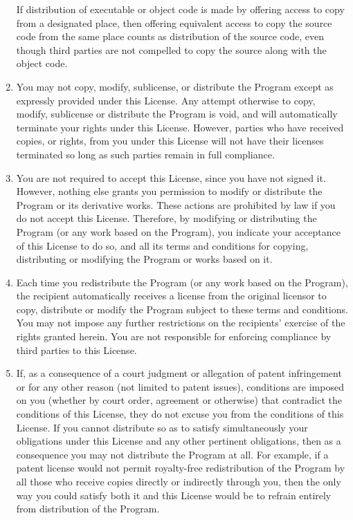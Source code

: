 \documentclass[oneside,english]{book}
\begin{document}
\begin{enumerate}
If distribution of executable or object code is made by offering access
to copy from a designated place, then offering equivalent access to
copy the source code from the same place counts as distribution of
the source code, even though third parties are not compelled to copy
the source along with the object code.

\item You may not copy, modify, sublicense, or distribute the Program except
as expressly provided under this License. Any attempt otherwise to
copy, modify, sublicense or distribute the Program is void, and will
automatically terminate your rights under this License. However, parties
who have received copies, or rights, from you under this License will
not have their licenses terminated so long as such parties remain
in full compliance.
\item You are not required to accept this License, since you have not signed
it. However, nothing else grants you permission to modify or distribute
the Program or its derivative works. These actions are prohibited
by law if you do not accept this License. Therefore, by modifying
or distributing the Program (or any work based on the Program), you
indicate your acceptance of this License to do so, and all its terms
and conditions for copying, distributing or modifying the Program
or works based on it.
\item Each time you redistribute the Program (or any work based on the Program),
the recipient automatically receives a license from the original licensor
to copy, distribute or modify the Program subject to these terms and
conditions. You may not impose any further restrictions on the recipients'
exercise of the rights granted herein. You are not responsible for
enforcing compliance by third parties to this License.
\item If, as a consequence of a court judgment or allegation of patent infringement
or for any other reason (not limited to patent issues), conditions
are imposed on you (whether by court order, agreement or otherwise)
that contradict the conditions of this License, they do not excuse
you from the conditions of this License. If you cannot distribute
so as to satisfy simultaneously your obligations under this License
and any other pertinent obligations, then as a consequence you may
not distribute the Program at all. For example, if a patent license
would not permit royalty-free redistribution of the Program by all
those who receive copies directly or indirectly through you, then
the only way you could satisfy both it and this License would be to
refrain entirely from distribution of the Program.



\end{enumerate}
\end{document}
